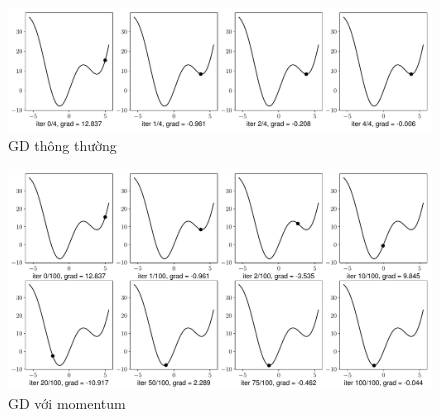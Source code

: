 \begin{figure}[t]
\centering
\includegraphics[width = \textwidth]{ebookML_src/src/grad_descent/gd1d_nomomentum.pdf}
\caption[]{GD thông thường}
\label{fig:8_nomomen}
\end{figure}

\begin{figure}[t]
\centering
\includegraphics[width = \textwidth]{ebookML_src/src/grad_descent/gd1d_momentum_0.pdf}
\caption[]{GD với momentum}
\label{fig:8_momen}
\end{figure}




